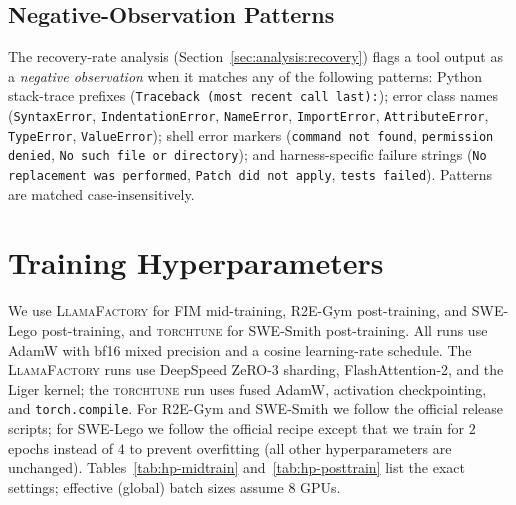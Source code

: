 \subsection{Negative-Observation Patterns}
\label{app:algo:neg_patterns}

The recovery-rate analysis (Section~\ref{sec:analysis:recovery}) flags
a tool output as a \emph{negative observation} when it matches any of
the following patterns: Python stack-trace prefixes
(\texttt{Traceback (most recent call last):}); error class names
(\texttt{SyntaxError}, \texttt{IndentationError}, \texttt{NameError},
\texttt{ImportError}, \texttt{AttributeError}, \texttt{TypeError},
\texttt{ValueError}); shell error markers
(\texttt{command not found}, \texttt{permission denied}, \texttt{No such file or directory});
and harness-specific failure strings
(\texttt{No replacement was performed}, \texttt{Patch did not apply},
\texttt{tests failed}). Patterns are matched case-insensitively.

\section{Training Hyperparameters}
\label{app:hp}

We use \textsc{LlamaFactory} for FIM mid-training, R2E-Gym
post-training, and SWE-Lego post-training, and \textsc{torchtune} for
SWE-Smith post-training. All runs use AdamW with bf16 mixed precision
and a cosine learning-rate schedule. The \textsc{LlamaFactory} runs use
DeepSpeed ZeRO-3 sharding, FlashAttention-2, and the Liger kernel; the
\textsc{torchtune} run uses fused AdamW, activation checkpointing, and
\texttt{torch.compile}. For R2E-Gym and SWE-Smith we follow the
official release scripts; for SWE-Lego we follow the official recipe
except that we train for $2$ epochs instead of $4$ to prevent
overfitting (all other hyperparameters are unchanged).
Tables~\ref{tab:hp-midtrain} and~\ref{tab:hp-posttrain} list the exact
settings; effective (global) batch sizes assume $8$ GPUs.

